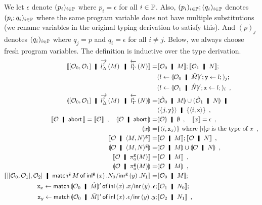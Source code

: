 {We let $\epsilon$ denote $(p_i)_{i\in\mathbb{P}}$ where $p_i=\epsilon$
for all $i\in\mathbb{P}$.
Also, $(p_i)_{i\in\mathbb{P}}; (q_i)_{i\in\mathbb{P}}$ denotes
$(p_i; q_i)_{i\in\mathbb{P}}$ where the
same program variable does not have multiple substitutions
(we rename variables in the original typing derivation to satisfy this).
And $(p)_j$ denotes $(q_i)_{i\in\mathbb{P}}$ where $q_j = p$ and $q_i =
\epsilon$ for all $i\neq j$.
Below, we always choose fresh program variables.
The definition is inductive over the type derivation.
{\footnotesize
\begin{align*}
 \semo{\cotuple{\hypert_0,\hypert_1}\hmid \ltor j l \Delta M\hmid \rtol i l\Gamma N}
 =& \semo{\hypert_0\hmid M};
 \semo{\hypert_1\hmid N};\\
 &(l\leftarrow \semoi{\hypert_0\hmid\hat M}'; \p
 y\leftarrow l;)_j; \\
 &(l\leftarrow \semoi{\hypert_1\hmid\hat N}'; \p
 x\leftarrow l;)_i\enspace,\\
 \semoi{\cotuple{\hypert_0,\hypert_1}\hmid\ltor j l \Delta M\hmid \rtol i l\Gamma N} =&
 \semoi{\hat \hypert_0\hmid M} \cup \semoi{\hat \hypert_1\hmid N} \hmid\\& \tuple{\{j,\p
 y\}}\hmid \{\tuple{i,\p x}\}\enspace,\\
 \semo{\hypert\hmid \abort}=\semo{\hypert}\enspace,\quad
 \semoi{\hypert\hmid\abort}=&\semoi{\hypert}\hmid \emptyset\enspace,\quad
 \semo{x}= \epsilon \enspace,\\
 \semoi{x}=& \{\tuple{i,\p x_x}\} \text{ where $[i]\varphi$ is the type
 of $x$}\enspace,\\
 \semo{\hypert\hmid \gpair{M,N}}=&
 \semo{\hypert\hmid M}; \semo{\hypert\hmid N}\enspace,\\
 \semoi{\hypert\hmid \gpair{M,N}} =&
 \semoi{\hypert\hmid M}\cup \semoi{\hypert\hmid N}\enspace,\\
 \semo{\hypert\hmid \pi_a^\g(M)}=&\semo{\hypert\hmid M}\enspace,\\
 \semoi{\hypert\hmid\pi_a^\g(M)}=&\semoi{\hypert\hmid M}\enspace,\\
  \semo{\cotuple{\cotuple{\hypert_0,\hypert_1},\hypert_2}\hmid
   \gmat  M x {N_0} y {N_1}}
 =&\semo{\hypert_0\hmid M}; \\
  \p{x}_x \leftarrow \lmat {\semoi{\hypert_0\hmid \hat M}'} {x} {x} {y} {\epsilon}; &\semo{\hypert_1 \hmid N_0}; \\
  \p{x}_y \leftarrow \lmat {\semoi{\hypert_0\hmid \hat M}'} {x} {\epsilon} {y} {y}; &\semo{\hypert_2 \hmid N_1}\enspace,\\

\end{align*}}}
